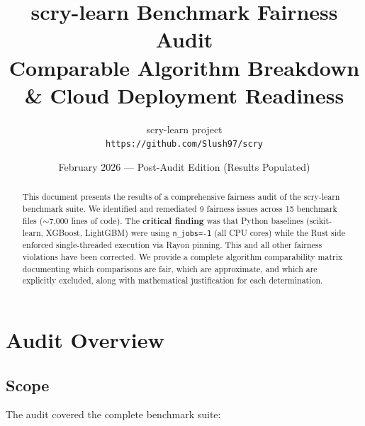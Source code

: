 \documentclass[11pt,a4paper]{article}
\title{
    \textbf{scry-learn Benchmark Fairness Audit} \\[0.5em]
    \Large Comparable Algorithm Breakdown \& Cloud Deployment Readiness
}
\author{
    scry-learn project \\
    \texttt{https://github.com/Slush97/scry}
}
\date{February 2026 — Post-Audit Edition (Results Populated)}
\begin{document}
\maketitle

\begin{abstract}
This document presents the results of a comprehensive fairness audit
of the scry-learn benchmark suite. We identified and remediated 9
fairness issues across 15 benchmark files ($\sim$7,000 lines of code).
The \textbf{critical finding} was that Python baselines (scikit-learn,
XGBoost, LightGBM) were using \texttt{n\_jobs=-1} (all CPU cores) while
the Rust side enforced single-threaded execution via Rayon pinning.
This and all other fairness violations have been corrected. We provide
a complete algorithm comparability matrix documenting which comparisons
are fair, which are approximate, and which are explicitly excluded, along
with mathematical justification for each determination.
\end{abstract}

\section{Audit Overview}

\subsection{Scope}

The audit covered the complete benchmark suite:
\end{document}
